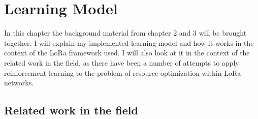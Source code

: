 
\chapter{Learning Model}

In this chapter the background material from chapter 2 and 3 will be 
brought together. I will explain my implemented learning model and
how it works in the context of the LoRa framework used. I will also 
look at it in the context of the related work in the field, as there
have been a number of attempts to apply reinforcement learning 
to the problem of resource optimization within LoRa networks.

\section{Related work in the field}

